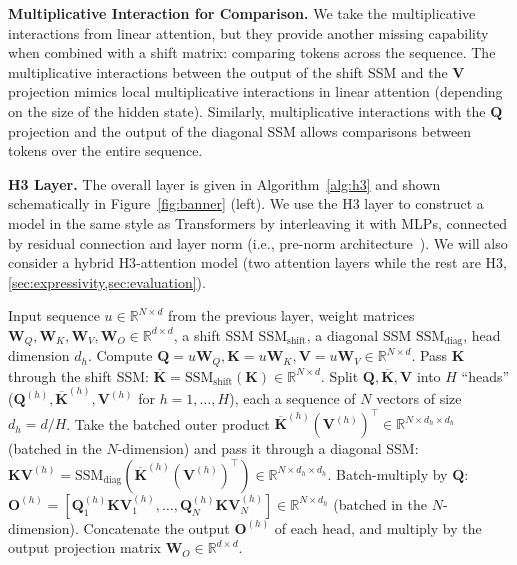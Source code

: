 \textbf{Multiplicative Interaction for Comparison.} We take the multiplicative interactions from linear attention, but they provide another missing capability when combined with a shift matrix: comparing tokens across the sequence. The multiplicative interactions between the output of the shift SSM and the $\mathbf{V}$ projection mimics local multiplicative interactions in linear attention (depending on the size of the hidden state). Similarly, multiplicative interactions with the $\mathbf{Q}$ projection and the output of the diagonal SSM allows comparisons between tokens over the entire sequence.

\textbf{\textsc{H3} Layer.} The overall layer is given in Algorithm~\ref{alg:h3} and shown schematically in Figure~\ref{fig:banner} (left). We use the \textsc{H3} layer to construct a model in the same style as Transformers by interleaving it with MLPs, connected by residual connection and layer norm (i.e., pre-norm architecture~\citep{baevski2018adaptive}). We will also consider a hybrid \textsc{H3}-attention model (two attention layers while the rest are \textsc{H3}, \ref{sec:expressivity,sec:evaluation}).

\begin{algorithm}[H]
  \caption{\label{alg:h3} H3 Layer}
  \small
  \begin{algorithmic}[1]
    \REQUIRE Input sequence $u \in \mathbb{R}^{N \times d}$ from the previous layer, weight matrices $\mathbf{W}_Q, \mathbf{W}_K, \mathbf{W}_V, \mathbf{W}_O \in \mathbb{R}^{d \times d}$, a shift SSM $\mathrm{SSM}_\mathrm{shift}$, a diagonal SSM $\mathrm{SSM}_{\mathrm{diag}}$, head dimension $d_h$.
    \STATE Compute $\mathbf{Q} = u \mathbf{W}_Q, \mathbf{K} = u \mathbf{W}_K, \mathbf{V} = u \mathbf{W}_V \in \mathbb{R}^{N \times d}$.
    \STATE Pass $\mathbf{K}$ through the shift SSM: $\overline{\mathbf{K}} = \mathrm{SSM}_\mathrm{shift}(\mathbf{K}) \in \mathbb{R}^{N \times d}$.
    \STATE Split $\mathbf{Q}, \overline{\mathbf{K}}, \mathbf{V}$ into $H$ ``heads'' ($\mathbf{Q}^{(h)}, {\overline{\mathbf{K}}}^{(h)}, \mathbf{V}^{(h)}$
    for $h = 1, \dots, H$), each a sequence of $N$ vectors of size $d_{h} = d / H$.
    \STATE Take the batched outer product ${\overline{\mathbf{K}}}^{(h)} (\mathbf{V}^{(h)})^\top \in \mathbb{R}^{N \times d_h \times d_h}$ (batched in the $N$-dimension) and pass it through a diagonal SSM: $\mathbf{K}\mathbf{V}^{(h)} = \mathrm{SSM}_{\mathrm{diag}}({\overline{\mathbf{K}}}^{(h)} (\mathbf{V}^{(h)})^\top) \in \mathbb{R}^{N \times d_{h} \times {d_{h}}}$.
    \STATE Batch-multiply by $\mathbf{Q}$:  $\mathbf{O}^{(h)} = [\mathbf{Q}^{(h)}_1 \mathbf{K}\mathbf{V}^{(h)}_1, \dots, \mathbf{Q}^{(h)}_N \mathbf{K}\mathbf{V}^{(h)}_N]\in  \mathbb{R}^{N \times d_h}$ (batched in the $N$-dimension).
    \ENDFOR
    \STATE Concatenate the output $\mathbf{O}^{(h)}$ of each head, and multiply by the output projection matrix $\mathbf{W}_O \in \mathbb{R}^{d \times d}$.
  \end{algorithmic}
\end{algorithm}

